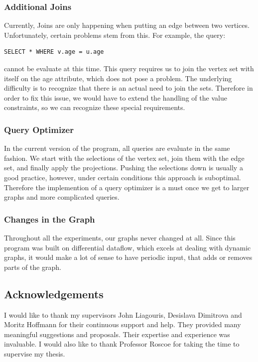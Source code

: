 \documentclass[11pt,singlecolumn]{scrartcl}
\begin{document}
\subsubsection{Additional Joins} Currently, Joins are only happening when putting an edge between two vertices. Unfortunately, certain problems stem from this. For example, the query: \begin{verbatim}SELECT * WHERE v.age = u.age\end{verbatim} cannot be evaluate at this time. This query requires us to join the vertex set with itself on the age attribute, which does not pose a problem. The underlying difficulty is to recognize that there is an actual need to join the sets. Therefore in order to fix this issue, we would have to extend the handling of the value constraints, so we can recognize these special requirements. 
\subsubsection{Query Optimizer} In the current version of the program, all queries are evaluate in the same fashion. We start with the selections of the vertex set, join them with the edge set, and finally apply the projections. Pushing the selections down is usually a good practice, however, under certain conditions this approach is suboptimal. Therefore the implemention of a query optimizer is a must once we get to larger graphs and more complicated queries.
\subsubsection{Changes in the Graph} Throughout all the experiments, our graphs never changed at all. Since this program was built on differential dataflow, which excels at dealing with dynamic graphs, it would make a lot of sense to have periodic input, that adds or removes parts of the graph.
\subsection{Acknowledgements}
I would like to thank my supervisors John Liagouris, Desislava Dimitrova and Moritz Hoffmann for their continuous support and help. They provided many meaningful suggestions and proposals. Their expertise and experience was invaluable.
I would also like to thank Professor Roscoe for taking the time to supervise my thesis.

\clearpage


{}

\end{document}
